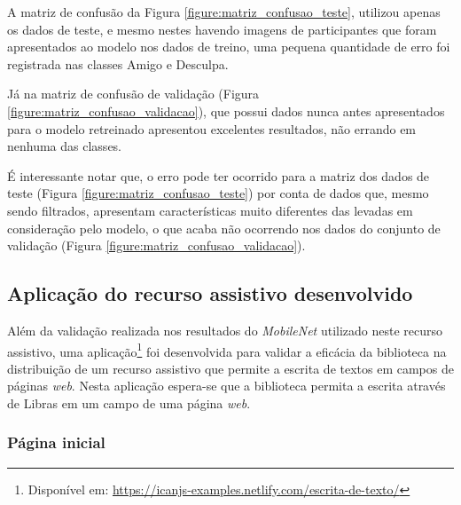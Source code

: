 \par A matriz de confusão da Figura \ref{figure:matriz_confusao_teste}, utilizou apenas os dados de teste, e mesmo nestes havendo imagens de participantes que foram apresentados ao modelo nos dados de treino, uma pequena quantidade de erro foi registrada nas classes Amigo e Desculpa.


\par Já na matriz de confusão de validação (Figura \ref{figure:matriz_confusao_validacao}), que possui dados nunca antes apresentados para o modelo retreinado apresentou excelentes resultados, não errando em nenhuma das classes.


\par É interessante notar que, o erro pode ter ocorrido para a matriz dos dados de teste (Figura \ref{figure:matriz_confusao_teste}) por conta de dados que, mesmo sendo filtrados, apresentam características muito diferentes das levadas em consideração pelo modelo, o que acaba não ocorrendo nos dados do conjunto de validação (Figura \ref{figure:matriz_confusao_validacao}).

\subsection{Aplicação do recurso assistivo desenvolvido}

\par Além da validação realizada nos resultados do \textit{MobileNet} utilizado neste recurso assistivo, uma aplicação\footnote{Disponível em: \url{https://icanjs-examples.netlify.com/escrita-de-texto/}} foi desenvolvida para validar a eficácia da biblioteca na distribuição de um recurso assistivo que permite a escrita de textos em campos de páginas \textit{web}. Nesta aplicação espera-se que a biblioteca permita a escrita através de Libras em um campo de uma página \textit{web}.

\subsubsection{Página inicial}

